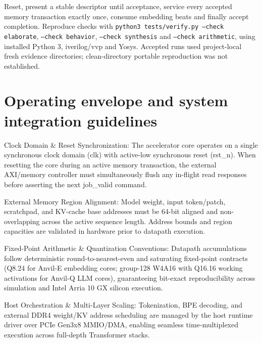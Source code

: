 \documentclass[11pt,a4paper]{article}
\begin{document}
Reset,\allowbreak{} present a stable descriptor until acceptance,\allowbreak{} service every accepted memory transaction exactly once,\allowbreak{} consume embedding beats and finally accept completion. Reproduce checks with \texttt{python3 tests/\allowbreak{}verify.py --check elaborate},\allowbreak{} \texttt{--check behavior},\allowbreak{} \texttt{--check synthesis} and \texttt{--check arithmetic},\allowbreak{} using installed Python 3,\allowbreak{} iverilog/\allowbreak{}vvp and Yosys. Accepted runs used project-local fresh evidence directories; clean-directory portable reproduction was not established.


\section{Operating envelope and system integration guidelines}

Clock Domain \& Reset Synchronization: The accelerator core operates on a single synchronous clock domain (\allowbreak{}clk)\allowbreak{} with active-low synchronous reset (\allowbreak{}rst\_\allowbreak{}n)\allowbreak{}. When resetting the core during an active memory transaction,\allowbreak{} the external AXI/\allowbreak{}memory controller must simultaneously flush any in-flight read responses before asserting the next job\_\allowbreak{}valid command.


External Memory Region Alignment: Model weight,\allowbreak{} input token/\allowbreak{}patch,\allowbreak{} scratchpad,\allowbreak{} and KV-cache base addresses must be 64-bit aligned and non-overlapping across the active sequence length. Address bounds and region capacities are validated in hardware prior to datapath execution.


Fixed-Point Arithmetic \& Quantization Conventions: Datapath accumulations follow deterministic round-to-nearest-even and saturating fixed-point contracts (\allowbreak{}Q8.24 for Anvil-E embedding cores; group-128 W4A16 with Q16.16 working activations for Anvil-Q LLM cores)\allowbreak{},\allowbreak{} guaranteeing bit-exact reproducibility across simulation and Intel Arria 10 GX silicon execution.


Host Orchestration \& Multi-Layer Scaling: Tokenization,\allowbreak{} BPE decoding,\allowbreak{} and external DDR4 weight/\allowbreak{}KV address scheduling are managed by the host runtime driver over PCIe Gen3x8 MMIO/\allowbreak{}DMA,\allowbreak{} enabling seamless time-multiplexed execution across full-depth Transformer stacks.
\end{document}
